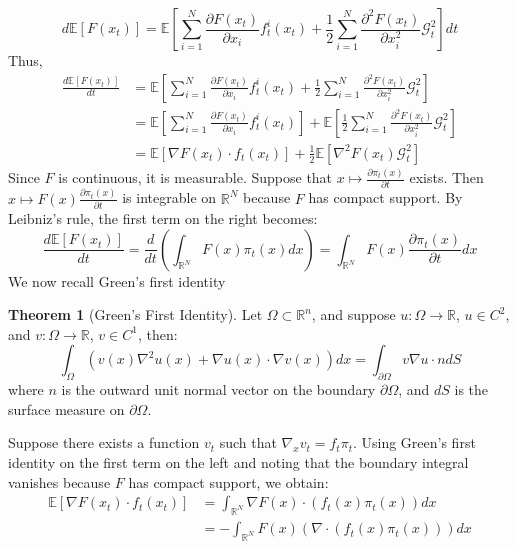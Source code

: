 \documentclass[a4paper,10pt]{article}
\theoremstyle{definition} %
\theoremstyle{definition} %
\theoremstyle{definition} %
\newtheorem{theorem}[definition]{Theorem}
\theoremstyle{definition} %
\newcommand{\0}{\boldsymbol{0}}
\begin{document}
\[
d\mathbb{E}[F(x_t)] = \mathbb{E}\left[\sum\limits_{i=1}^N \frac{\partial F(x_t)}{\partial x_i} f^i_t(x_t) + \frac{1}{2} \sum\limits_{i=1}^N \frac{\partial^2 F(x_t)}{\partial x_i^2} \mathcal{G}_t^2\right]dt
\]
Thus,
\begin{align}
    \frac{d\mathbb{E}[F(x_t)]}{dt} &= \mathbb{E}\left[\sum\limits_{i=1}^N \frac{\partial F(x_t)}{\partial x_i} f^i_t(x_t) + \frac{1}{2} \sum\limits_{i=1}^N  \frac{\partial^2 F(x_t)}{\partial x_i^2}\mathcal{G}_t^2\right] \nonumber \\
    &= \mathbb{E}\left[\sum\limits_{i=1}^N \frac{\partial F(x_t)}{\partial x_i} f^i_t(x_t)\right] + \mathbb{E}\left[\frac{1}{2} \sum\limits_{i=1}^N  \frac{\partial^2 F(x_t)}{\partial x_i^2} \mathcal{G}_t^2\right] \nonumber\\
    &= \mathbb{E}[ \nabla F(x_t) \cdot f_t(x_t)] + \frac{1}{2}\mathbb{E}[\nabla^2 F(x_t) \mathcal{G}_t^2] \label{eq:EsperanceEgality}
\end{align}
Since \( F \) is continuous, it is measurable. Suppose that \( x \mapsto \frac{\partial\pi_t(x)}{\partial t} \) exists. Then \( x \mapsto F(x)\frac{\partial\pi_t(x)}{\partial t} \) is integrable on \( \mathbb{R}^N \) because \( F \) has compact support. By Leibniz's rule, the first term on the right becomes:
\[
\frac{d\mathbb{E}[F(x_t)]}{dt} = \frac{d}{dt} \left(\int_{\mathbb{R}^N} F(x) \pi_t(x) dx\right) = \int_{\mathbb{R}^N}F(x)\frac{\partial\pi_t(x)}{\partial t} dx
\]
\vspace{2em}
We now recall Green’s first identity
\begin{theorem}[Green’s First Identity]
Let \( \Omega \subset \mathbb{R}^n \), and suppose \( u : \Omega \rightarrow \mathbb{R} \), \( u \in C^2 \), and \( v : \Omega \rightarrow \mathbb{R} \), \( v \in C^1 \), then:
\begin{equation}\label{eq:GreenId}
\int_\Omega (v(x)\nabla^2 u(x) + \nabla u(x) \cdot \nabla v(x)) dx = \int_{\partial\Omega} v \nabla u \cdot n dS
\end{equation}
where \( n \) is the outward unit normal vector on the boundary \( \partial\Omega \), and \( dS \) is the surface measure on \( \partial\Omega \).
\end{theorem}
Suppose there exists a function \( v_t \) such that \( \nabla_x v_t = f_t \pi_t \).
Using Green’s first identity on the first term on the left and noting that the boundary integral vanishes because \( F \) has compact support, we obtain:
\begin{align*}
    \mathbb{E}[\nabla F(x_t)\cdot f_t(x_t)] &=\int_{\mathbb{R}^N} \nabla F(x)\cdot (f_t(x) \pi_t(x)) dx \\
    &= - \int_{\mathbb{R}^N}F(x) (\nabla \cdot (f_t(x)\pi_t(x))) dx
\end{align*}
\end{document}
